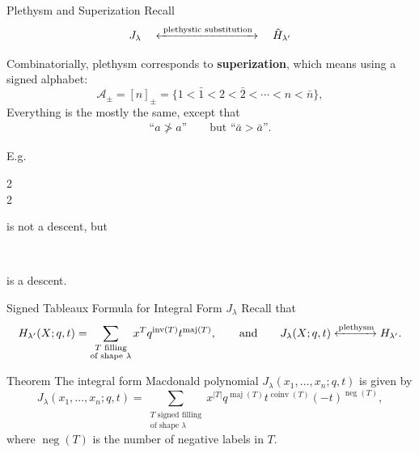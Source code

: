 \documentclass[aspectratio = 1609]{beamer}
\theoremstyle{definition}
\theoremstyle{plain} %
\DeclareMathOperator{\maj}{maj}
\DeclareMathOperator{\inv}{inv}
\DeclareMathOperator{\coinv}{coinv}
\begin{document}
\begin{frame}{Plethysm and Superization}
  Recall
  \[J_\lambda \quad \xleftrightarrow{\text{ plethystic substitution }} \quad \tilde{H}_{\lambda'}\]

  \vspace{2em}

  Combinatorially,
  plethysm corresponds to \textbf{superization},
  which means using a signed alphabet:
  \begin{equation*}
    \mathcal{A}_{\pm} = [n]_{\pm} = \{1 < \bar{1} < 2 < \bar{2} < \cdots < n < \bar{n}\},
  \end{equation*}
  Everything is the mostly the same, except that
  \begin{align*}
    \text{``}a \not > a\text{''} \qquad \text{but } \text{``}\bar{a} > \bar{a}\text{''}.
  \end{align*}

  \vspace{1em}


  E.g.~
  \begin{ytableau}
    2 \\ 2
  \end{ytableau}
  is not a descent, but
  \begin{ytableau}
     \\ 
  \end{ytableau}
  is a descent.
\end{frame}

\begin{frame}{Signed Tableaux Formula for Integral Form \(J_\lambda\)}
  Recall that
  \[H_{\lambda'}(X; q, t) = \sum_{\substack{T \text{ filling} \\ \text{of shape } \lambda}} 
  x^T
  q^{\inv(T)}
  t^{\maj(T)},
  \qquad
  \text{and}
  \qquad
  J_\lambda(X; q, t) \xleftrightarrow{\text{plethysm}} H_{\lambda'}.
  \]

  \begin{block}{Theorem \parencite{HHL05}}
    The integral form Macdonald polynomial \(J_{\lambda}(x_1, \dots, x_n; q, t)\) is given by
    \[
      J_{\lambda}(x_1, \dots, x_n; q, t)
      = \sum_{\substack{T \text{ signed filling} \\ \text{of shape } \lambda}}
      x^{|T|}
      q^{\maj(T)}
      t^{\coinv(T)}
      (-t)^{\operatorname{neg}(T)},
    \]
    where \(\operatorname{neg}(T)\) is the number of negative labels in \(T\).
  \end{block}
\end{frame}
\end{document}
